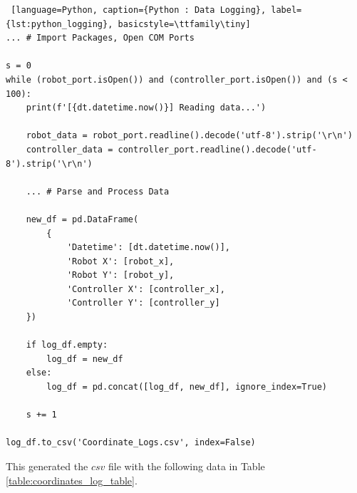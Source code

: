 \documentclass{article}
\begin{document}
\begin{lstlisting} [language=Python, caption={Python : Data Logging}, label={lst:python_logging}, basicstyle=\ttfamily\tiny]
... # Import Packages, Open COM Ports

s = 0
while (robot_port.isOpen()) and (controller_port.isOpen()) and (s < 100):
    print(f'[{dt.datetime.now()}] Reading data...')

    robot_data = robot_port.readline().decode('utf-8').strip('\r\n')
    controller_data = controller_port.readline().decode('utf-8').strip('\r\n')

    ... # Parse and Process Data

    new_df = pd.DataFrame(
        {
            'Datetime': [dt.datetime.now()],
            'Robot X': [robot_x],
            'Robot Y': [robot_y],
            'Controller X': [controller_x],
            'Controller Y': [controller_y]
    })

    if log_df.empty:
        log_df = new_df
    else:
        log_df = pd.concat([log_df, new_df], ignore_index=True)

    s += 1

log_df.to_csv('Coordinate_Logs.csv', index=False)
\end{lstlisting}

This generated the $csv$ file with the following data in Table \ref{table:coordinates_log_table}.
\end{document}
